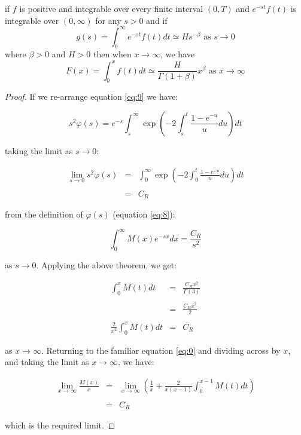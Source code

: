 \begin{mdframed}
	\begin{theorem}
		if $f$ is positive and integrable over every finite interval $(0, T)$ and $e^{-st}f(t)$ is integrable 
		over $(0, \infty)$ for any $s > 0$ and if \bigskip
		\[
			g(s) = \int_{0}^{\infty} e^{-st} f(t) dt \simeq H s^{-\beta} \text{ as } s \to 0
		\]\medskip
		where $\beta > 0$ and $H > 0$ then when $x \to \infty$, we have \bigskip
		\[
			F(x) = \int_{0}^{x} f(t) dt \simeq \frac{H}{\Gamma(1 + \beta)}  x^{\beta} \text{ as } x \to \infty
		\]\medskip
	\end{theorem}
\end{mdframed} \bigskip


\begin{proof}
	If we re-arrange equation \ref{eq:9} we have: \bigskip
	
	\[
		s^2 \varphi(s) = e^{-s} \int_{s}^{\infty} \exp \left( -2 \int_{s}^{t} \frac{1 - e^{-u}}{u} du \right) dt
	\]\medskip
	
	taking the limit as $s \to 0$: \bigskip
	
	\begin{eqnarray*}
		\lim_{s \to 0} s^2 \varphi(s) & = & \int_{0}^{\infty} \exp \left( -2 \int_{0}^{t} \frac{1 - e^{-u}}{u} du \right) dt \\\\
									  & = & C_R
	\end{eqnarray*}\medskip
	
	from the definition of $\varphi(s)$ (equation \ref{eq:8}): \bigskip
	
	\[
		\int_{0}^{\infty} M(x) e^{-sx} dx = \frac{C_R}{s^2} 
	\]\medskip
	
	as $s \to 0$. Applying the above theorem, we get: \bigskip
	
	\begin{eqnarray*}
					  \int_{0}^{x} M(t) dt & = & \frac{C_R x^2}{\Gamma(3)} \\\\
										   & = & \frac{C_R x^2}{2} \\\\
		\frac{2}{x^2} \int_{0}^{x} M(t) dt & = & C_R 
	\end{eqnarray*}\medskip
	
	as $x \to \infty$. Returning to the familiar equation \ref{eq:0} and dividing across by $x$, 
	and taking the limit as $x \to \infty$, we have: \bigskip
	
	\begin{eqnarray*}
		\lim_{x \to \infty} \frac{M(x)}{x} & = & \lim_{x \to \infty} \left( \frac{1}{x} + \frac{2}{x (x - 1)} \int_{0}^{x - 1} M(t) dt \right) \\\\
										   & = & C_R
	\end{eqnarray*}\medskip

	which is the required limit.
\end{proof}\bigskip











